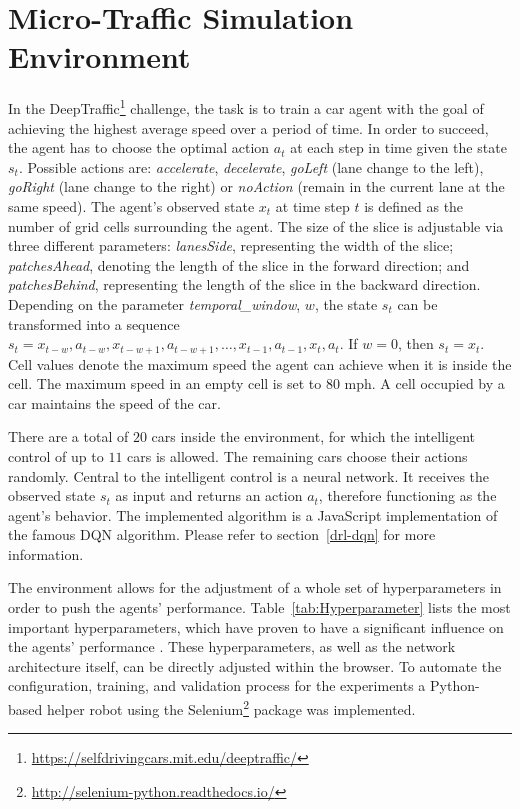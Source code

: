 \documentclass{article}
\begin{document}
\section{Micro-Traffic Simulation Environment}

In the DeepTraffic\footnote{\url{https://selfdrivingcars.mit.edu/deeptraffic/}} challenge, the task is to train a car agent with the goal of achieving the highest average speed over a period of time. In order to succeed, the agent has to choose the optimal action $a_t$ at each step in time given the state $s_t$. Possible actions are: \emph{accelerate}, \emph{decelerate}, \emph{goLeft} (lane change to the left), \emph{goRight} (lane change to the right) or \emph{noAction} (remain in the current lane at the same speed). The agent's observed state $x_t$ at time step $t$ is defined as the number of grid cells surrounding the agent. The size of the slice is adjustable via three different parameters: \emph{lanesSide}, representing the width of the slice; \emph{patchesAhead}, denoting the length of the slice in the forward direction; and \emph{patchesBehind}, representing the length of the slice in the backward direction. Depending on the parameter \emph{temporal\_window}, $w$, the state $s_t$ can be transformed into a sequence $s_t = x_{t-w}, a_{t-w}, x_{t-w+1}, a_{t-w+1}, \dots, x_{t-1}, a_{t-1}, x_{t}, a_{t}$. If $w=0$, then $s_t=x_t$. Cell values denote the maximum speed the agent can achieve when it is inside the cell. The maximum speed in an empty cell is set to $80$ mph. A cell occupied by a car maintains the speed of the car. 

There are a total of $20$ cars inside the environment, for which the intelligent control of up to $11$ cars is allowed. The remaining cars choose their actions randomly.
Central to the intelligent control is a neural network. It receives the observed state $s_t$ as input and returns an action $a_t$, therefore functioning as the agent's behavior. The implemented algorithm is a JavaScript implementation of the famous DQN \cite{Mnih.2013} algorithm. Please refer to section~\ref{drl-dqn} for more information.

The environment allows for the adjustment of a whole set of hyperparameters in order to push the agents' performance. Table~\ref{tab:Hyperparameter} lists the most important hyperparameters, which have proven to have a significant influence on the agents' performance \cite{FRIDMAN.2018}.
These hyperparameters, as well as the network architecture itself, can be directly adjusted within the browser. To automate the configuration, training, and validation process for the experiments a Python-based helper robot using the Selenium\footnote{\url{http://selenium-python.readthedocs.io/}} package was implemented.
\end{document}
